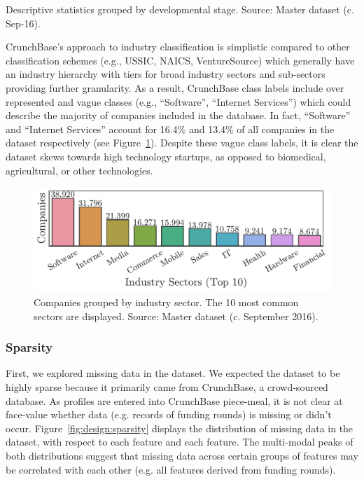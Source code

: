 \documentclass[../thesis/thesis.tex]{subfiles}
\begin{document}
\begin{table}[!htb]
    \centering
    \scalebox{0.9}{}
    \caption[Descriptive statistics]{Descriptive statistics grouped by developmental stage. Source: Master dataset (c. Sep-16).}
    \label{tab:design:descriptive_statistics}
\end{table}

CrunchBase's approach to industry classification is simplistic compared to other classification schemes (e.g., USSIC, NAICS, VentureSource) which generally have an industry hierarchy with tiers for broad industry sectors and sub-sectors providing further granularity. As a result, CrunchBase class labels include over represented and vague classes (e.g., ``Software'', ``Internet Services'') which could describe the majority of companies included in the database. In fact, ``Software'' and ``Internet Services'' account for 16.4\% and 13.4\% of all companies in the dataset respectively (see Figure~\ref{fig:design:industry_counts}). Despite these vague class labels, it is clear the dataset skews towards high technology startups, as opposed to biomedical, agricultural, or other technologies.

\begin{figure}[!htb]
    \centering
    \includegraphics[width=\textwidth]{../figures/design/descriptives_counts_industry}
    \caption[Companies by industry sector]{Companies grouped by industry sector. The 10 most common sectors are displayed. Source: Master dataset (c. September 2016).}
    \label{fig:design:industry_counts}
\end{figure}

\subsubsection{Sparsity}

First, we explored missing data in the dataset. We expected the dataset to be highly sparse because it primarily came from CrunchBase, a crowd-sourced database. As profiles are entered into CrunchBase piece-meal, it is not clear at face-value whether data (e.g. records of funding rounds) is missing or didn't occur. Figure~\ref{fig:design:sparsity} displays the distribution of missing data in the dataset, with respect to each feature and each feature. The multi-modal peaks of both distributions suggest that missing data across certain groups of features may be correlated with each other (e.g. all features derived from funding rounds).
\end{document}
